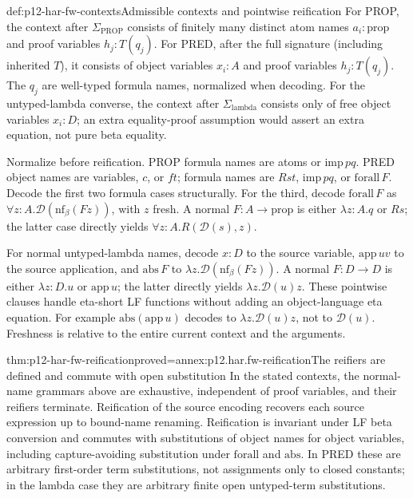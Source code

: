 \begin{hbdefinition}{def:p12-har-fw-contexts}{Admissible contexts and pointwise reification}
For PROP, the context after \(\Sigma_{\mathrm{PROP}}\) consists
of finitely many distinct atom names \(a_i:\mathrm{prop}\) and
proof variables \(h_j:T(q_j)\). For PRED, after the full signature
(including inherited \(T\)), it consists of object variables
\(x_i:A\) and proof variables \(h_j:T(q_j)\).
The \(q_j\) are well-typed formula names, normalized when decoding.
For the untyped-lambda converse, the context after
\(\Sigma_{\mathrm{lambda}}\) consists only of free object
variables \(x_i:D\); an extra equality-proof assumption would assert
an extra equation, not pure beta equality.

Normalize before reification. PROP formula names are atoms or
\(\mathrm{imp}\,p q\). PRED object names are variables, \(c\),
or \(ft\); formula names are \(Rst\), \(\mathrm{imp}\,p q\),
or \(\mathrm{forall}\,F\). Decode the first two formula cases
structurally. For the third, decode
\(\mathrm{forall}\,F\) as
\(\forall z:A.\mathcal D(\mathrm{nf}_\beta(Fz))\), with \(z\)
fresh. A normal \(F:A\to\mathrm{prop}\) is either
\(\lambda z:A.q\) or \(Rs\); the latter case directly yields
\(\forall z:A.R(\mathcal D(s),z)\).

For normal untyped-lambda names, decode \(x:D\) to the source
variable, \(\mathrm{app}\,uv\) to the source application, and
\(\mathrm{abs}\,F\) to
\(\lambda z.\mathcal D(\mathrm{nf}_\beta(Fz))\).
A normal \(F:D\to D\) is either \(\lambda z:D.u\) or
\(\mathrm{app}\,u\); the latter directly yields
\(\lambda z.\mathcal D(u)z\). These pointwise clauses handle
eta-short LF functions without adding an object-language eta equation.
For example \(\mathrm{abs}(\mathrm{app}\,u)\) decodes to
\(\lambda z.\mathcal D(u)z\), not to \(\mathcal D(u)\).
Freshness is relative to the entire current context and the arguments.
\end{hbdefinition}

\begin{hblemma}{thm:p12-har-fw-reification}{proved=annex:p12.har.fw-reification}{The reifiers are defined and commute with open substitution}
In the stated contexts, the normal-name grammars above are exhaustive,
independent of proof variables, and their reifiers terminate. Reification
of the source encoding recovers each source expression up to bound-name
renaming. Reification is invariant under LF beta conversion and commutes
with substitutions of object names for object variables, including
capture-avoiding substitution under \(\mathrm{forall}\) and
\(\mathrm{abs}\). In PRED these are arbitrary first-order term
substitutions, not assignments only to closed constants; in the lambda
case they are arbitrary finite open untyped-term substitutions.
\end{hblemma}

